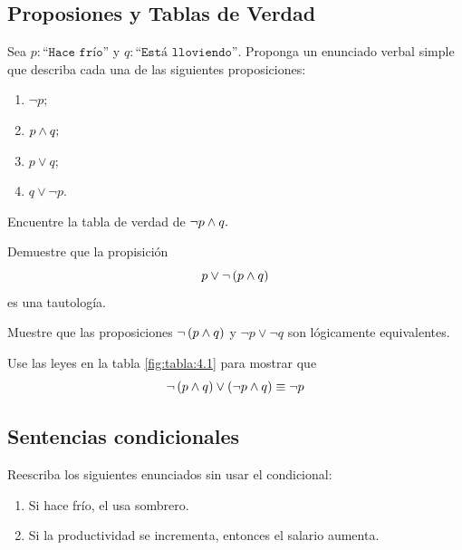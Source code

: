 \subsection{Proposiones y Tablas de Verdad}


 \begin{exmp}
  Sea $p:\texttt{``Hace fr\'io''}$ y $q:\texttt{``Est\'a lloviendo''.}$ Proponga un enunciado verbal simple que describa cada una de las siguientes proposiciones:
  \begin{enumerate}
   \item $\neg p;$
   \item $p \wedge q;$
   \item $p \vee q;$
   \item $q \vee \neg p.$
  \end{enumerate}

 \end{exmp}




 \begin{exmp}
  Encuentre la tabla de verdad de $\neg p \wedge q.$
 \end{exmp}




 \begin{exmp}
  Demuestre que la propisici\'on 
  $$
  p \vee \neg \left( p\wedge q \right)
  $$ es una tautolog\'ia.
 \end{exmp}




 \begin{exmp}
  Muestre que las proposiciones $\neg\left( p \wedge q \right)$ y $\neg p \vee \neg q$ son l\'ogicamente equivalentes.
 \end{exmp}




 \begin{exmp}
  Use las leyes en la tabla \ref{fig:tabla:4.1} para mostrar que 
  $$
  \neg \left( p \wedge q \right) \vee \left( \neg p \wedge  q \right) \equiv \neg p
  $$
 \end{exmp}



\subsection{Sentencias condicionales}


 \begin{exmp}
  \label{lip:sol:4.6}
  Reescriba los siguientes enunciados sin usar el condicional:
  \begin{enumerate}
   \item Si hace fr\'io, el usa sombrero. 
   \item Si la productividad se incrementa, entonces el salario aumenta.
  \end{enumerate}

 \end{exmp}




